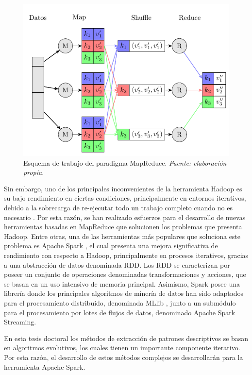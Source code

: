 \documentclass[c5paper,10pt,twoside]{book}	   	%
\begin{document}
\begin{figure}[!hbtp]
	\centering
	\includegraphics[width=0.8\linewidth]{./Figures/mapreduce.pdf}
	\caption[Esquema de trabajo del paradigma MapReduce.]{Esquema de trabajo del paradigma MapReduce. \textit{Fuente: elaboración propia.}}
	\label{fig:mapreduce}
\end{figure}

Sin embargo, uno de los principales inconvenientes de la herramienta Hadoop es su bajo rendimiento en ciertas condiciones, principalmente en entornos iterativos, debido a la sobrecarga de re-ejecutar todo un trabajo completo cuando no es necesario \cite{Lin13}. Por esta razón, se han realizado esfuerzos para el desarrollo de nuevas herramientas basadas en MapReduce que solucionen los problemas que presenta Hadoop. Entre otras, una de las herramientas más populares que soluciona este problema es Apache Spark \cite{Zcddmmfs12}, el cual presenta una mejora significativa de rendimiento con respecto a Hadoop, principalmente en procesos iterativos, gracias a una abstracción de datos denominada \ac{RDD}. Los RDD se caracterizan por poseer un conjunto de operaciones denominadas transformaciones y acciones, que se basan en un uso intensivo de memoria principal. Asimismo, Spark posee una librería donde los principales algoritmos de minería de datos han sido adaptados para el procesamiento distribuido, denominada MLlib \cite{Mllib15}, junto a un submódulo para el procesamiento por lotes de flujos de datos, denominado Apache Spark Streaming.

En esta tesis doctoral los métodos de extracción de patrones descriptivos se basan en algoritmos evolutivos, los cuales tienen un importante componente iterativo. Por esta razón, el desarrollo de estos métodos complejos se desarrollarán para la herramienta Apache Spark.
\end{document}
